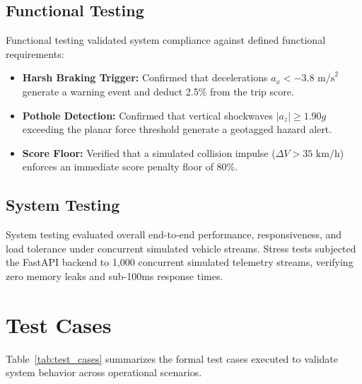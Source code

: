 \subsection{Functional Testing}
Functional testing validated system compliance against defined functional requirements:
\begin{itemize}
    \item \textbf{Harsh Braking Trigger:} Confirmed that decelerations $a_x < -3.8\text{ m/s}^2$ generate a warning event and deduct 2.5\% from the trip score.
    \item \textbf{Pothole Detection:} Confirmed that vertical shockwaves $|a_z| \ge 1.90g$ exceeding the planar force threshold generate a geotagged hazard alert.
    \item \textbf{Score Floor:} Verified that a simulated collision impulse ($\Delta V > 35\text{ km/h}$) enforces an immediate score penalty floor of 80\%.
\end{itemize}

\subsection{System Testing}
System testing evaluated overall end-to-end performance, responsiveness, and load tolerance under concurrent simulated vehicle streams. Stress tests subjected the FastAPI backend to 1,000 concurrent simulated telemetry streams, verifying zero memory leaks and sub-100ms response times.

\section{Test Cases}
\label{sec:test_cases}
Table~\ref{tab:test_cases} summarizes the formal test cases executed to validate system behavior across operational scenarios.

